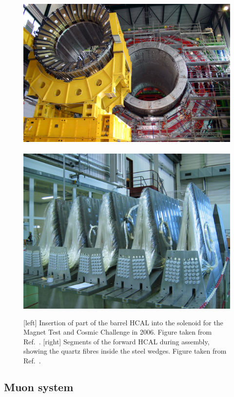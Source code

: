\begin{figure}[tpb]
  \centering
  \includegraphics[height=0.2\textheight]{figures/cms/cms_hcal}
~
  \includegraphics[height=0.2\textheight]{figures/cms/cms_hf_cds1431489}
  \caption{[left] Insertion of part of the barrel HCAL into the solenoid for the Magnet Test
and Cosmic Challenge in 2006. Figure taken from Ref.~\cite{CMS_hcal}.
[right] Segments of the forward HCAL during assembly, showing the quartz fibres inside the steel
wedges. Figure taken from Ref.~\cite{CMS_hf}. 
  \label{fig:cms_hcal}}
\end{figure}

\subsection{Muon system \label{sec:cms_muon_system}}

